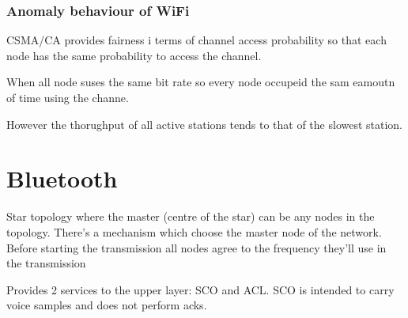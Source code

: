 \subsection{Anomaly behaviour of WiFi}
CSMA/CA provides fairness i terms of channel access probability so that each node has the same probability to access the channel. 

When all node suses the same bit rate so every node occupeid the sam eamoutn of time using the channe. 

However the thorughput of all active stations tends to that of the slowest station.

\chapter{Bluetooth}
Star topology where the master (centre of the star) can be any nodes in the topology. There's a mechanism which choose the master node of the network. 
Before starting the transmission all nodes agree to the frequency they'll use in the transmission 

Provides 2 services to the upper layer: SCO and ACL.
SCO is intended to carry voice samples and does not perform acks. 




 







 
































 